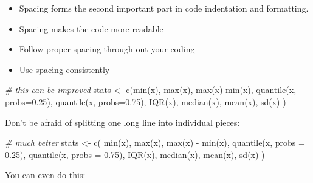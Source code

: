 \documentclass[
]{book}
\newenvironment{Shaded}{\begin{snugshade}}{\end{snugshade}}
\newcommand{\AttributeTok}[1]{\textcolor[rgb]{0.77,0.63,0.00}{#1}}
\newcommand{\CommentTok}[1]{\textcolor[rgb]{0.56,0.35,0.01}{\textit{#1}}}
\newcommand{\FloatTok}[1]{\textcolor[rgb]{0.00,0.00,0.81}{#1}}
\newcommand{\FunctionTok}[1]{\textcolor[rgb]{0.00,0.00,0.00}{#1}}
\newcommand{\NormalTok}[1]{#1}
\newcommand{\OtherTok}[1]{\textcolor[rgb]{0.56,0.35,0.01}{#1}}
\newcommand{\SpecialCharTok}[1]{\textcolor[rgb]{0.00,0.00,0.00}{#1}}
\providecommand{\tightlist}{%
  \setlength{\itemsep}{0pt}\setlength{\parskip}{0pt}}
\begin{document}
\begin{itemize}
\tightlist
\item
  Spacing forms the second important part in code indentation and formatting.
\item
  Spacing makes the code more readable
\item
  Follow proper spacing through out your coding
\item
  Use spacing consistently
\end{itemize}

\begin{Shaded}
\begin{Highlighting}[]
\CommentTok{\# this can be improved}
\NormalTok{stats }\OtherTok{\textless{}{-}} \FunctionTok{c}\NormalTok{(}\FunctionTok{min}\NormalTok{(x), }\FunctionTok{max}\NormalTok{(x), }\FunctionTok{max}\NormalTok{(x)}\SpecialCharTok{{-}}\FunctionTok{min}\NormalTok{(x),}
  \FunctionTok{quantile}\NormalTok{(x, }\AttributeTok{probs=}\FloatTok{0.25}\NormalTok{), }\FunctionTok{quantile}\NormalTok{(x, }\AttributeTok{probs=}\FloatTok{0.75}\NormalTok{), }\FunctionTok{IQR}\NormalTok{(x),}
  \FunctionTok{median}\NormalTok{(x), }\FunctionTok{mean}\NormalTok{(x), }\FunctionTok{sd}\NormalTok{(x)}
\NormalTok{)}
\end{Highlighting}
\end{Shaded}

Don't be afraid of splitting one long line into individual pieces:

\begin{Shaded}
\begin{Highlighting}[]
\CommentTok{\# much better}
\NormalTok{stats }\OtherTok{\textless{}{-}} \FunctionTok{c}\NormalTok{(}
  \FunctionTok{min}\NormalTok{(x), }
  \FunctionTok{max}\NormalTok{(x), }
  \FunctionTok{max}\NormalTok{(x) }\SpecialCharTok{{-}} \FunctionTok{min}\NormalTok{(x),}
  \FunctionTok{quantile}\NormalTok{(x, }\AttributeTok{probs =} \FloatTok{0.25}\NormalTok{),}
  \FunctionTok{quantile}\NormalTok{(x, }\AttributeTok{probs =} \FloatTok{0.75}\NormalTok{),}
  \FunctionTok{IQR}\NormalTok{(x),}
  \FunctionTok{median}\NormalTok{(x), }
  \FunctionTok{mean}\NormalTok{(x), }
  \FunctionTok{sd}\NormalTok{(x)}
\NormalTok{)}
\end{Highlighting}
\end{Shaded}

You can even do this:
\end{document}
